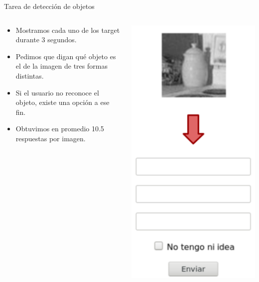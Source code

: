 \documentclass[compress]{beamer}
\begin{document}
\begin{frame}{Tarea de detección de objetos}

  \begin{columns}[T]
    \begin{column}{.5\textwidth}
        \vspace{0.7cm}
        \begin{itemize}
        \item Mostramos cada uno de los target durante 3 segundos.
        \item Pedimos que digan qué objeto es el de la imagen de tres formas distintas.
        \item Si el usuario no reconoce el objeto, existe una opción a ese fin.
        \item Obtuvimos en promedio 10.5 respuestas por imagen.
        \end{itemize}
    \end{column}
    \begin{column}{.5\textwidth}
        \begin{center}
        \includegraphics[width=.5\textwidth]{images/online-task.png} 
        \end{center}
        \vspace{0.25cm}
    \end{column}
  \end{columns}



\end{frame}
\end{document}
